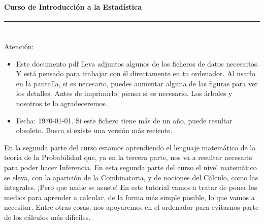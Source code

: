 \documentclass[10pt,a4paper]{article}\usepackage[]{graphicx}\usepackage[]{color}
\newcounter {cont01}
\begin{document}

\paragraph{\hspace{6.3cm}Curso de Introducción a la Estadística\\[2mm]} \noindent\hrule

\setcounter{section}{0}
\section*{\hspace{-0.1cm}}
{
     Atención:
          \begin{itemize}
     \item Este documento pdf lleva adjuntos algunos de los ficheros de datos necesarios. Y está pensado para trabajar con él directamente en tu ordenador. Al usarlo en la pantalla, si es necesario, puedes aumentar alguna de las figuras para ver los detalles. Antes de imprimirlo, piensa si es necesario. Los árboles y nosotros te lo agradeceremos.
     \item Fecha: \today. Si este fichero tiene más de un año, puede resultar obsoleto. Busca si existe una versión más reciente.
     \end{itemize}
}
\setcounter{tocdepth}{1}
\tableofcontents

\noindent{\bf \\
}

En la segunda parte del curso estamos aprendiendo el lenguaje matemático de la teoría de la Probabilidad que, ya en la tercera parte, nos va a resultar necesario para poder hacer Inferencia. En esta segunda parte del curso el nivel matemático se eleva, con la aparición de la Combinatoria, y de nociones del Cálculo, como las integrales. ¡Pero que nadie se asuste! En este tutorial vamos a tratar de poner los medios para aprender a calcular, de la forma más simple posible, lo que vamos a necesitar. Entre otras cosas, nos apoyaremos en el ordenador para evitarnos parte de los cálculos más difíciles.
\end{document}
